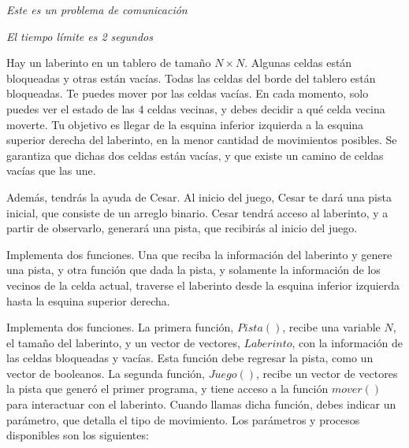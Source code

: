 \documentclass[12pt]{scrartcl}
\begin{document}
    
    {\itshape Este es un problema de comunicación}
    
    {\itshape El tiempo límite es 2 segundos}
    
    \vspace{10pt}

    Hay un laberinto en un tablero de tamaño $N\times N$. Algunas celdas están bloqueadas y otras están vacías. Todas las celdas del borde del tablero están bloqueadas. Te puedes mover por las celdas vacías. En cada momento, solo puedes ver el estado de las 4 celdas vecinas, y debes decidir a qué celda vecina moverte. Tu objetivo es llegar de la esquina inferior izquierda a la esquina superior derecha del laberinto, en la menor cantidad de movimientos posibles. Se garantiza que dichas dos celdas están vacías, y que existe un camino de celdas vacías que las une. 

    Además, tendrás la ayuda de Cesar. Al inicio del juego, Cesar te dará una pista inicial, que consiste de un arreglo binario. Cesar tendrá acceso al laberinto, y a partir de observarlo, generará una pista, que recibirás al inicio del juego. 

    
    Implementa dos funciones. Una que reciba la información del laberinto y genere una pista, y otra función que dada la pista, y solamente la información de los vecinos de la celda actual, traverse el laberinto desde la esquina inferior izquierda hasta la esquina superior derecha.


    Implementa dos funciones. La primera función, $Pista()$, recibe una variable $N$, el tamaño del laberinto, y un vector de vectores, $Laberinto$, con la información de las celdas bloqueadas y vacías. Esta función debe regresar la pista, como un vector de booleanos. La segunda función, $Juego()$, recibe un vector de vectores la pista que generó el primer programa, y tiene acceso a la función $mover()$ para interactuar con el laberinto. Cuando llamas dicha función, debes indicar un parámetro, que detalla el tipo de movimiento. Los parámetros y procesos disponibles son los siguientes:
\end{document}
